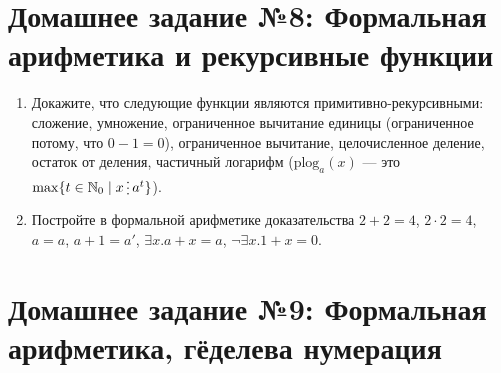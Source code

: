\documentclass[10pt,a4paper,oneside]{article}
\begin{document}
\section*{Домашнее задание №8: Формальная арифметика и рекурсивные функции}

\begin{enumerate}
\item Докажите, что следующие функции являются примитивно-рекурсивными: сложение, умножение,
ограниченное вычитание единицы (ограниченное потому, что $0-1=0$), ограниченное вычитание,
целочисленное деление, остаток от деления, частичный логарифм 
($\mathrm{plog}_a(x)$ --- это $\max \{t \in \mathbb{N}_0 \mid x \mathop{\raisebox{-2pt}{\vdots}} a^t \}$).

\item Постройте в формальной арифметике доказательства $2+2=4$, $2 \cdot 2 = 4$, $a=a$, 
$a+1=a'$, $\exists x.a+x=a$, $\neg\exists x.1+x=0$.
\end{enumerate}

\section*{Домашнее задание №9: Формальная арифметика, гёделева нумерация}
\end{document}
